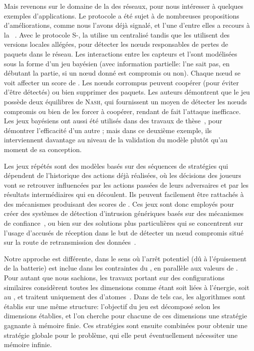 Mais revenons sur le domaine de la \secu des réseaux, pour nous intéresser à quelques exemples d'applications.
Le protocole \leach a été sujet à de nombreuses propositions d'améliorations, comme nous l'avons déjà signalé, et l'une d'entre elles a recours à la ~\cite{MMZ09}.
Avec le protocole S-\leach, la \sdb utilise un \ids centralisé tandis que les \chs utilisent des versions locales allégées, pour détecter les nœuds responsables de pertes de paquets dans le réseau.
Les interactions entre les capteurs et l'\IDS sont modélisées sous la forme d'un jeu bayésien (\cad avec information partielle: l'\IDS ne sait pas, en débutant la partie, si un nœud donné est compromis ou non).
Chaque nœud se voit affecter un score de \reput.
Les nœuds corrompus peuvent coopérer (pour éviter d'être détectés) ou bien supprimer des paquets.
Les auteurs démontrent que le jeu possède deux équilibres de \textsc{Nash}, qui fournissent un moyen de détecter les nœuds compromis ou bien de les forcer à coopérer, rendant de fait l'attaque inefficace.
Les jeux bayésiens ont aussi été utilisés dans des travaux de thèse~\cite{Ham12}, pour démontrer l'efficacité d'un autre \ids; mais dans ce deuxième exemple, ils interviennent davantage au niveau de la validation \aposteriori du modèle plutôt qu'au moment de sa conception.

Les jeux répétés sont des modèles basés sur des séquences de stratégies qui dépendent de l'historique des actions déjà réalisées, où les décisions des joueurs vont se retrouver influencées par les actions passées de leurs adversaires et par les résultats intermédiaires qui en découlent.
Ils peuvent facilement être rattachés à des mécanismes produisant des scores de \reput.
Ces jeux sont donc employés pour créer des systèmes de détection d'intrusion génériques basés sur des mécanismes de confiance~\cite{AD07}, ou bien sur des solutions plus particulières qui se concentrent sur l'usage d'accusés de réception dans le but de détecter un nœud compromis situé sur la route de retransmission des données~\cite{Red09}.

\bigskip
Notre approche est différente, dans le sens où l'arrêt potentiel (dû à l'épuisement de la batterie) est inclue dans les contraintes du , en parallèle aux valeurs de .
Pour autant que nous sachions, les travaux portant sur des configurations similaires considèrent toutes les dimensions comme étant soit liées à l'énergie, soit au , et traitent uniquement des  d'atomes~\cite{chatterjee12,velner12a}.
Dans de tels cas, les algorithmes sont établis sur une même structure: l'objectif du jeu est décomposé selon les dimensions établies, et l'on cherche pour chacune de ces dimensions une stratégie gagnante à mémoire finie.
Ces stratégies sont ensuite combinées pour obtenir une stratégie globale pour le problème, qui elle peut éventuellement nécessiter une mémoire infinie.

